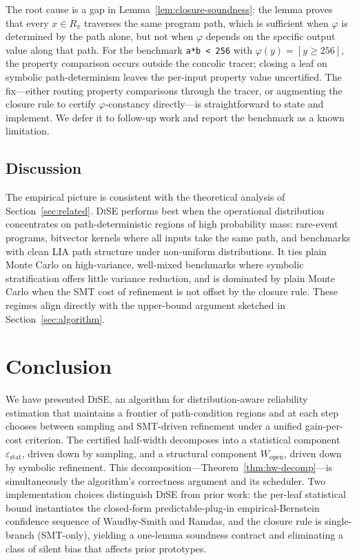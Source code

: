 \documentclass[runningheads]{llncs}
\providecommand{\Cref}[1]{Section~\ref{#1}}
\newcommand{\prop}{\varphi}
\newcommand{\Wopen}{W_{\mathrm{open}}}
\newcommand{\epsstat}{\varepsilon_{\mathrm{stat}}}
\newcommand{\toolname}{\textsc{DiSE}}
\newcommand{\code}[1]{\texttt{#1}}
\begin{document}
The root cause is a gap in Lemma~\ref{lem:closure-soundness}: the
lemma proves that every $x \in R_\pi$ traverses the same program
path, which is sufficient when $\prop$ is determined by the path
alone, but not when $\prop$ depends on the specific output value along
that path.  For the benchmark \code{a*b < 256} with
$\prop(y) = [y \ge 256]$, the property comparison occurs outside the
concolic tracer; closing a leaf on symbolic path-determinism leaves
the per-input property value uncertified.  The fix---either routing
property comparisons through the tracer, or augmenting the closure
rule to certify $\prop$-constancy directly---is straightforward to
state and implement.  We defer it to follow-up work and report the
benchmark as a known limitation.

\subsection{Discussion}\label{sec:discussion}

The empirical picture is consistent with the theoretical analysis of
\Cref{sec:related}.  \toolname{} performs best when the operational
distribution concentrates on path-deterministic regions of high
probability mass: rare-event programs, bitvector kernels where all
inputs take the same path, and benchmarks with clean LIA path
structure under non-uniform distributions.  It ties plain Monte Carlo
on high-variance, well-mixed benchmarks where symbolic stratification
offers little variance reduction, and is dominated by plain Monte
Carlo when the SMT cost of refinement is not offset by the closure
rule.  These regimes align directly with the upper-bound argument
sketched in \Cref{sec:algorithm}.

\section{Conclusion}\label{sec:conclusion}

We have presented \toolname{}, an algorithm for distribution-aware
reliability estimation that maintains a frontier of path-condition
regions and at each step chooses between sampling and SMT-driven
refinement under a unified gain-per-cost criterion.  The certified
half-width decomposes into a statistical component $\epsstat$, driven
down by sampling, and a structural component $\Wopen$, driven down by
symbolic refinement.  This decomposition---Theorem~\ref{thm:hw-decomp}---is
simultaneously the algorithm's correctness argument and its scheduler.
Two implementation choices distinguish \toolname{} from prior
work: the per-leaf statistical bound instantiates the closed-form
predictable-plug-in empirical-Bernstein confidence sequence of Waudby-Smith
and Ramdas, and the closure rule is single-branch (SMT-only), yielding
a one-lemma soundness contract and eliminating a class of silent bias
that affects prior prototypes.
\end{document}
